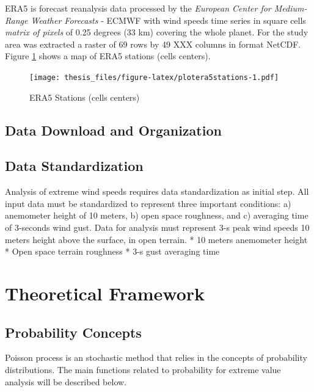 \documentclass[12pt,oneside]{reedthesis}
\begin{document}
ERA5 is forecast reanalysis data processed by the \emph{European Center for Medium-Range Weather Forecasts} - ECMWF with wind speeds time series in square cells \emph{matrix of pixels} of 0.25 degrees (33 km) covering the whole planet. For the study area was extracted a raster of 69 rows by 49 XXX columns in format NetCDF. Figure \ref{fig:plotera5stations} shows a map of ERA5 stations (cells centers).
\begin{figure}
\centering
\texttt{[image: thesis\_files/figure-latex/plotera5stations-1.pdf]}
\caption{\label{fig:plotera5stations}ERA5 Stations (cells centers)}
\end{figure}
\hypertarget{data-download-and-organization}{%
\section{Data Download and Organization}\label{data-download-and-organization}}

\hypertarget{data-standardization}{%
\section{Data Standardization}\label{data-standardization}}

Analysis of extreme wind speeds requires data standardization as initial step. All input data must be standardized to represent three important conditions: a) anemometer height of 10 meters, b) open space roughness, and c) averaging time of 3-seconds wind gust. Data for analysis must represent 3-s peak wind speeds 10 meters height above the surface, in open terrain.
* 10 meters anemometer height
* Open space terrain roughness
* 3-s gust averaging time

\clearpage

\hypertarget{rmd-thefra}{%
\chapter{Theoretical Framework}\label{rmd-thefra}}

\hypertarget{probability-concepts}{%
\section{Probability Concepts}\label{probability-concepts}}

Poisson process is an stochastic method that relies in the concepts of probability distributions. The main functions related to probability for extreme value analysis will be described below.
\end{document}
